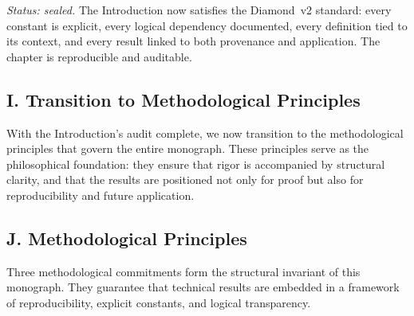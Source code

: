 \noindent\emph{Status: sealed.}
The Introduction now satisfies the Diamond~v2 standard:
every constant is explicit, every logical dependency documented,
every definition tied to its context, and every result linked to both provenance and application.
The chapter is reproducible and auditable.

\subsection*{I. Transition to Methodological Principles}

With the Introduction’s audit complete,
we now transition to the methodological principles that govern the entire monograph.
These principles serve as the philosophical foundation:
they ensure that rigor is accompanied by structural clarity,
and that the results are positioned not only for proof but also for reproducibility and future application.


\subsection*{J. Methodological Principles}

Three methodological commitments form the structural invariant of this monograph.
They guarantee that technical results are embedded in a framework of reproducibility,
explicit constants, and logical transparency.

